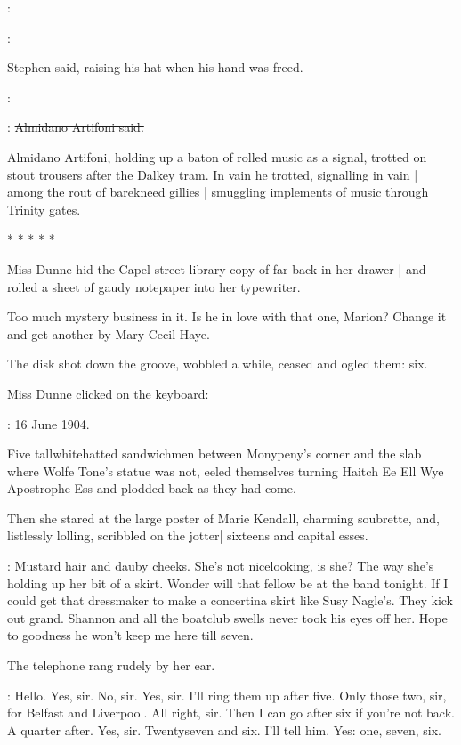 \artifoni:

\Stephen:

Stephen said,
raising his hat when his hand was freed.

\Stephen:

\artifoni:
\sout{Almidano Artifoni said.}

Almidano Artifoni,
holding up a baton of rolled music as a signal,
trotted on stout trousers after the Dalkey tram.
In vain he trotted,
signalling in vain |
among the rout of barekneed gillies |
smuggling implements of music through Trinity gates.


    * * * * *


Miss Dunne hid the Capel street library copy
of  far back in her drawer |
and rolled a sheet of gaudy notepaper into her typewriter.%

Too much mystery business in it.
Is he in love with that one, Marion?
Change it and get another by Mary Cecil Haye.

The disk shot down the groove,
wobbled a while,
ceased and ogled them: six.

Miss Dunne clicked on the keyboard:

\missdunne:
16 June 1904.

Five tallwhitehatted sandwichmen
between Monypeny's corner and the slab where Wolfe Tone's statue was not,
eeled themselves turning
Haitch Ee Ell Wye Apostrophe Ess \stage{[H.E.L.Y.'S]}
and plodded back as they had come.

Then she stared at the large poster of Marie Kendall,
charming soubrette,
and,
listlessly lolling,
scribbled on the jotter|
sixteens and capital esses.

\dunneint:
Mustard hair and dauby cheeks.
She's not nicelooking, is she?
The way she's holding up her bit of a skirt.
Wonder will that fellow be at the band tonight.
If I could get that dressmaker to make a concertina skirt like Susy Nagle's.
They kick out grand.
Shannon and all the boatclub swells never took his eyes off her.
Hope to goodness he won't keep me here till seven.

The telephone rang rudely by her ear.

\missdunne:
Hello.
Yes, sir.
No, sir.
Yes, sir.
I'll ring them up after five.
Only those two, sir, for Belfast and Liverpool.
All right, sir.
Then I can go after six if you're not back.
A quarter after.
Yes, sir.
Twentyseven and six.
I'll tell him.
Yes: one, seven, six.

